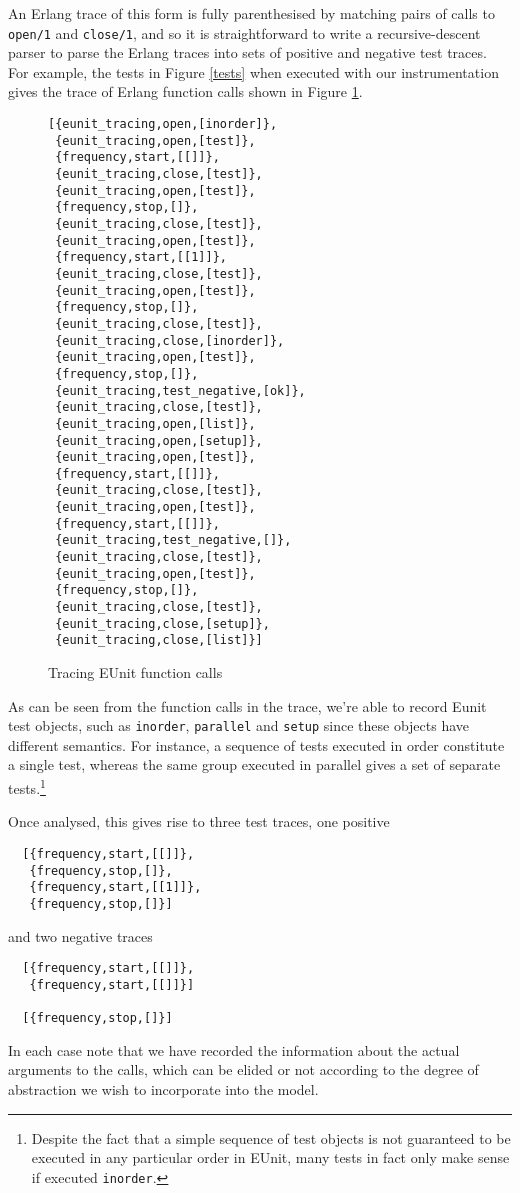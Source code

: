 \documentclass[]{sigplanconf}
\begin{document}
An Erlang trace of this form is fully parenthesised by matching pairs of calls to \texttt{open/1} and \texttt{close/1}, and so it is straightforward to write a recursive-descent parser to parse the Erlang traces into sets of positive and negative test traces. For example, the tests in Figure \ref{tests}
when executed with our instrumentation gives the  trace of Erlang function calls shown in Figure \ref{tracing-eunit}.
\begin{figure}
\begin{verbatim}
[{eunit_tracing,open,[inorder]},
 {eunit_tracing,open,[test]},
 {frequency,start,[[]]},
 {eunit_tracing,close,[test]},
 {eunit_tracing,open,[test]},
 {frequency,stop,[]},
 {eunit_tracing,close,[test]},
 {eunit_tracing,open,[test]},
 {frequency,start,[[1]]},
 {eunit_tracing,close,[test]},
 {eunit_tracing,open,[test]},
 {frequency,stop,[]},
 {eunit_tracing,close,[test]},
 {eunit_tracing,close,[inorder]},
 {eunit_tracing,open,[test]},
 {frequency,stop,[]},
 {eunit_tracing,test_negative,[ok]},
 {eunit_tracing,close,[test]},
 {eunit_tracing,open,[list]},
 {eunit_tracing,open,[setup]},
 {eunit_tracing,open,[test]},
 {frequency,start,[[]]},
 {eunit_tracing,close,[test]},
 {eunit_tracing,open,[test]},
 {frequency,start,[[]]},
 {eunit_tracing,test_negative,[]},
 {eunit_tracing,close,[test]},
 {eunit_tracing,open,[test]},
 {frequency,stop,[]},
 {eunit_tracing,close,[test]},
 {eunit_tracing,close,[setup]},
 {eunit_tracing,close,[list]}]
\end{verbatim}
\caption{Tracing EUnit function calls}
\label{tracing-eunit}
\end{figure}
As can be seen from the function calls in the trace, we're able to record Eunit test objects, such as \texttt{inorder}, \texttt{parallel} and \texttt{setup} since these objects have different semantics. For instance, a sequence of tests executed in order constitute a single test, whereas the same group executed in parallel gives a set of separate tests.\footnote{Despite the fact that a simple sequence of test objects is not guaranteed to be executed in any particular order in EUnit, many tests in fact only make sense if executed \texttt{inorder}.}

Once analysed, this gives rise to three test traces, one positive
\begin{verbatim}
  [{frequency,start,[[]]},
   {frequency,stop,[]},
   {frequency,start,[[1]]},
   {frequency,stop,[]}]
\end{verbatim}
and two negative traces
\begin{verbatim}
  [{frequency,start,[[]]},
   {frequency,start,[[]]}]
   
  [{frequency,stop,[]}]
\end{verbatim}
In each case note that we have recorded the information about the actual arguments to the calls, which can be elided or not according to the degree of abstraction we wish to incorporate into the model.
\end{document}
